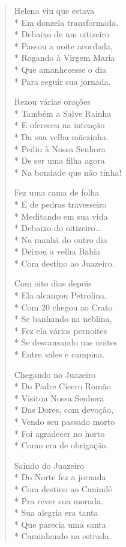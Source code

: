 \begin{verse}
Helena viu que estava\\*
Em donzela transformada.\\*
Debaixo de um oitizeiro\\*
Passou a noite acordada,\\*
Rogando à Virgem Maria\\*
Que amanhecesse o dia\\*
Para seguir sua jornada.

Rezou várias orações\\*
Também a Salve Rainha\\*
E ofereceu na intenção\\*
Da sua velha mãezinha.\\*
Pediu à Nossa Senhora\\*
De ser uma filha agora\\*
Na bondade que não tinha!

Fez uma cama de folha\\*
E de pedras travesseiro\\*
Meditando em sua vida\\*
Debaixo do oitizeiro...\\*
Na manhã do outro dia\\*
Deixou a velha Bahia\\*
Com destino ao Juazeiro.

Com oito dias depois\\*
Ela alcançou Petrolina,\\*
Com 20 chegou ao Crato\\*
Se banhando na neblina,\\*
Fez ela vários pernoites\\*
Se descansando nas noites\\*
Entre vales e campina.

Chegando no Juazeiro\\*
Do Padre Cícero Romão\\*
Visitou Nossa Senhora\\*
Das Dores, com devoção,\\*
Vendo seu passado morto\\*
Foi agradecer no horto\\*
Como era de obrigação.

Saindo do Juazeiro\\*
Do Norte fez a jornada\\*
Com destino ao Canindé\\*
Pra rever sua morada.\\*
Sua alegria era tanta\\*
Que parecia uma santa\\*
Caminhando na estrada.


\end{verse}
